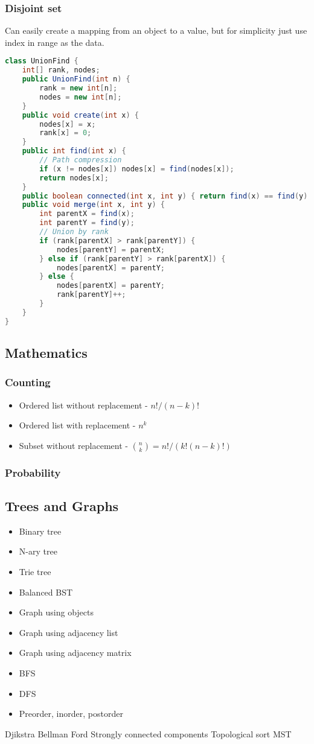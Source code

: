 \documentclass{article}
\begin{document}
\subsubsection{Disjoint set}
Can easily create a mapping from an object to a value, but for simplicity just use index in range as the data.
\begin{lstlisting}[language=java]
class UnionFind {
    int[] rank, nodes;
    public UnionFind(int n) {
        rank = new int[n];
        nodes = new int[n];
    }
    public void create(int x) {
        nodes[x] = x;
        rank[x] = 0;
    }
    public int find(int x) {
        // Path compression
        if (x != nodes[x]) nodes[x] = find(nodes[x]);
        return nodes[x];
    }
    public boolean connected(int x, int y) { return find(x) == find(y); }
    public void merge(int x, int y) {
        int parentX = find(x);
        int parentY = find(y);
        // Union by rank
        if (rank[parentX] > rank[parentY]) {
            nodes[parentY] = parentX;
        } else if (rank[parentY] > rank[parentX]) {
            nodes[parentX] = parentY;
        } else {
            nodes[parentX] = parentY;
            rank[parentY]++;
        }
    }
}
\end{lstlisting}

\subsection{Mathematics}
\subsubsection{Counting}
\begin{itemize}
    \item Ordered list without replacement - $n!/(n-k)!$
    \item Ordered list with replacement - $n^k$
    \item Subset without replacement - $\binom{n}{k} = n!/(k!(n-k)!)$
\end{itemize}
\subsubsection{Probability}

\subsection{Trees and Graphs}
\begin{itemize}
    \item Binary tree
    \item N-ary tree
    \item Trie tree
    \item Balanced BST
    \item Graph using objects
    \item Graph using adjacency list
    \item Graph using adjacency matrix
    \item BFS
    \item DFS
    \item Preorder, inorder, postorder
\end{itemize}
Djikstra
Bellman Ford
Strongly connected components
Topological sort
MST
\end{document}
